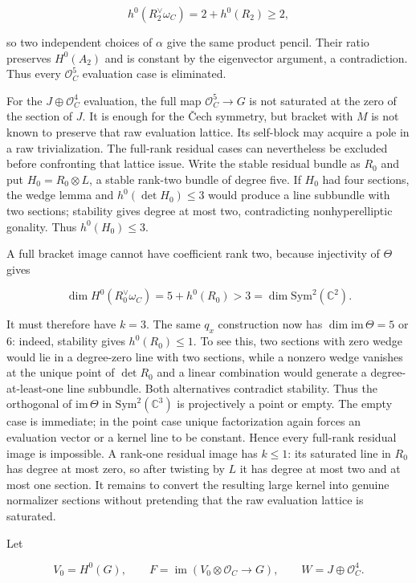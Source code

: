 \documentclass[11pt]{article}
\theoremstyle{definition}
\begin{document}
\[h^0(R_2^\vee\omega_C)=2+h^0(R_2)\ge2,\]

so two independent choices of \(\alpha\) give the same product pencil.
Their ratio preserves \(H^0(A_2)\) and is constant by the eigenvector
argument, a contradiction. Thus every \(\mathcal O_C^5\) evaluation case
is eliminated.

For the \(J\oplus\mathcal O_C^4\) evaluation, the full map
\(\mathcal O_C^5\to G\) is not saturated at the zero of the section of
\(J\). It is enough for the \v{C}ech symmetry, but bracket with \(M\) is not
known to preserve that raw evaluation lattice. Its self-block may
acquire a pole in a raw trivialization. The full-rank residual cases can
nevertheless be excluded before confronting that lattice issue. Write
the stable residual bundle as \(R_0\) and put \(H_0=R_0\otimes L\), a
stable rank-two bundle of degree five. If \(H_0\) had four sections, the
wedge lemma and \(h^0(\det H_0)\le3\) would produce a line subbundle
with two sections; stability gives degree at most two, contradicting
nonhyperelliptic gonality. Thus \(h^0(H_0)\le3\).

A full bracket image cannot have coefficient rank two, because
injectivity of \(\Theta\) gives

\[\dim H^0(R_0^\vee\omega_C)=5+h^0(R_0)>3
  =\dim\mathrm{Sym}^2(\mathbb C^2).\]

It must therefore have \(k=3\). The same \(q_x\) construction now has
\(\dim\mathrm{im}\,\Theta=5\) or \(6\): indeed, stability gives
\(h^0(R_0)\le1\). To see this, two sections with zero wedge would lie in
a degree-zero line with two sections, while a nonzero wedge vanishes at
the unique point of \(\det R_0\) and a linear combination would generate
a degree-at-least-one line subbundle. Both alternatives contradict
stability. Thus the orthogonal of \(\mathrm{im}\,\Theta\) in
\(\mathrm{Sym}^2(\mathbb C^3)\) is projectively a point or empty. The
empty case is immediate; in the point case unique factorization again
forces an evaluation vector or a kernel line to be constant. Hence every
full-rank residual image is impossible. A rank-one residual image has
\(k\le1\): its saturated line in \(R_0\) has degree at most zero, so
after twisting by \(L\) it has degree at most two and at most one
section. It remains to convert the resulting large kernel into genuine
normalizer sections without pretending that the raw evaluation lattice
is saturated.

Let

\[V_0=H^0(G),\qquad
F=\operatorname{im}(V_0\otimes\mathcal O_C\to G),\qquad
W=J\oplus\mathcal O_C^4.\]
\end{document}
